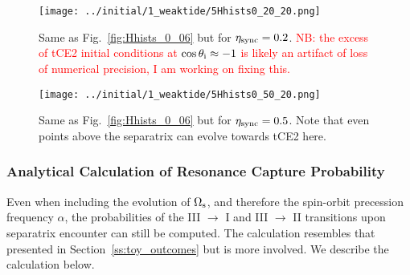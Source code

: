 \documentclass[
        fleqn,
        usenatbib,
    ]{mnras}
\begin{document}
\begin{figure}
    \centering
    \texttt{[image: ../initial/1\_weaktide/5Hhists0\_20\_20.png]}
    \caption{Same as Fig.~\ref{fig:Hhists_0_06} but for $\eta_{\rm sync} =
    0.2$.
    \textcolor{red}{NB\@: the excess of tCE2 initial conditions at $\cos
    \theta_{\rm i} \approx -1$ is likely an artifact of loss of numerical
    precision, I am working on fixing this.}
    }\label{fig:Hhists_0_20}
\end{figure}
\begin{figure}
    \centering
    \texttt{[image: ../initial/1\_weaktide/5Hhists0\_50\_20.png]}
    \caption{Same as Fig.~\ref{fig:Hhists_0_06} but for $\eta_{\rm sync} =
    0.5$. Note that even points above the separatrix can evolve towards tCE2
    here.}\label{fig:Hhists_0_50}
\end{figure}

\subsubsection{Analytical Calculation of Resonance Capture Probability
}\label{ss:phop_weaktide}

Even when including the evolution of $\Omega_{\rm s}$, and therefore the
spin-orbit precession frequency $\alpha$, the probabilities of the III $\to$ I
and III $\to$ II transitions upon separatrix encounter can still be computed.
The calculation resembles that presented in Section~\ref{ss:toy_outcomes} but is
more involved. We describe the calculation below.
\end{document}
